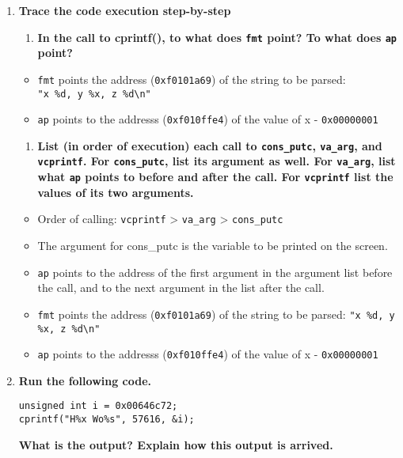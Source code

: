 \documentclass[]{article}
\begin{document}
\begin{enumerate}
\def\labelenumi{\arabic{enumi}.}
\setcounter{enumi}{2}
\item
  \textbf{Trace the code execution step-by-step}

  \begin{enumerate}
  \def\labelenumii{\roman{enumii}.}
  \itemsep1pt\parskip0pt
  \item
    \textbf{In the call to cprintf(), to what does \texttt{fmt} point?
    To what does \texttt{ap} point?}
  \end{enumerate}

  \begin{itemize}
  \itemsep1pt\parskip0pt
  \item
    \texttt{fmt} points the address (\texttt{0xf0101a69}) of the string
    to be parsed:\\ \texttt{"x \%d, y \%x, z \%d\textbackslash{}n"}
  \item
    \texttt{ap} points to the addresss (\texttt{0xf010ffe4}) of the
    value of x - \texttt{0x00000001}
  \end{itemize}

  \begin{enumerate}
  \def\labelenumii{\roman{enumii}.}
  \setcounter{enumii}{1}
  \itemsep1pt\parskip0pt
  \item
    \textbf{List (in order of execution) each call to
    \texttt{cons\_putc}, \texttt{va\_arg}, and \texttt{vcprintf}. For
    \texttt{cons\_putc}, list its argument as well. For
    \texttt{va\_arg}, list what \texttt{ap} points to before and after
    the call. For \texttt{vcprintf} list the values of its two
    arguments.}
  \end{enumerate}

  \begin{itemize}
  \itemsep1pt\parskip0pt
  \item
    Order of calling: \texttt{vcprintf} \textgreater{} \texttt{va\_arg}
    \textgreater{} \texttt{cons\_putc}
  \item
    The argument for cons\_putc is the variable to be printed on the
    screen.
  \item
    \texttt{ap} points to the address of the first argument in the
    argument list before the call, and to the next argument in the list
    after the call.
  \item
    \texttt{fmt} points the address (\texttt{0xf0101a69}) of the string
    to be parsed: \texttt{"x \%d, y \%x, z \%d\textbackslash{}n"}
  \item
    \texttt{ap} points to the addresss (\texttt{0xf010ffe4}) of the
    value of x - \texttt{0x00000001}
  \end{itemize}
\item
  \textbf{Run the following code.}

\begin{verbatim}
unsigned int i = 0x00646c72;
cprintf("H%x Wo%s", 57616, &i);
\end{verbatim}

  \textbf{What is the output? Explain how this output is arrived.}
\end{enumerate}
\end{document}
